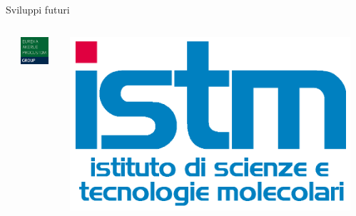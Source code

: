\documentclass[8pt]{beamer}
\begin{document}
\begin{frame}{Sviluppi futuri}
\begin{columns}
\begin{center}
		\end{center}
		\begin{center}
			\includegraphics[width=0.8\textwidth]{beam_eap_logo.jpg}
		\end{center}
		\begin{center}
			\includegraphics[width=\textwidth]{beam_istm_logo.png}
		\end{center}
		\begin{center}

\end{center}
\end{columns}
\end{frame}
\end{document}
